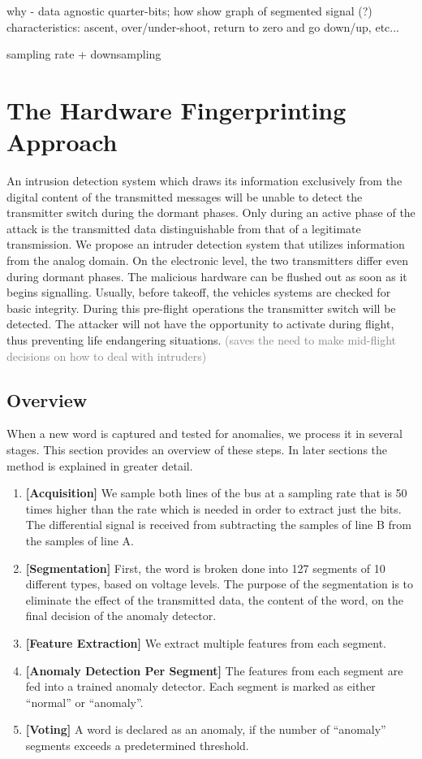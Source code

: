 \documentclass[conference]{IEEEtran}
\begin{document}
  \color{gray}
  why - data agnostic
  quarter-bits; how
  show graph of segmented signal (?)
  characteristics: ascent, over/under-shoot, return to zero and go down/up,
  etc...

  sampling rate + downsampling
  \color{black}
  
\section{The Hardware Fingerprinting Approach}
  An intrusion detection system which draws its information exclusively from the digital content of the transmitted messages will be unable to detect the transmitter switch during the dormant phases. Only during an active phase of the attack is the transmitted data distinguishable from that of a legitimate transmission. We propose an intruder detection system that utilizes information from the analog domain. On the electronic level, the two transmitters differ even during dormant phases. The malicious hardware can be flushed out as soon as it begins signalling.
  Usually, before takeoff, the vehicles systems are checked for basic integrity. During this pre-flight operations the transmitter switch will be detected. The attacker will not have the opportunity to activate during flight, thus preventing life endangering situations. \textcolor{gray}{(saves the need to make mid-flight decisions on how to deal with intruders)}
  
\subsection{Overview} \label{Overview}
  When a new word is captured and tested for anomalies, we process it in several stages. This section provides an overview of these steps. In later sections the method is explained in greater detail.
  
  \begin{enumerate}
    \item \textbf{[Acquisition]}
          We sample both lines of the bus at a sampling rate that is 50 times higher than the rate which is needed in order to extract just the bits. The differential signal is received from subtracting the samples of line B from the samples of line A.
    \item \textbf{[Segmentation]}
          First, the word is broken done into 127 segments of 10 different types, based on voltage levels. The purpose of the segmentation is to eliminate the effect of the transmitted data, the content of the word, on the final decision of the anomaly detector.
    \item \textbf{[Feature Extraction]}
          We extract multiple features from each segment. 
    \item \textbf{[Anomaly Detection Per Segment]}
          The features from each segment are fed into a trained anomaly detector. Each segment is marked as either ``normal'' or ``anomaly''.
    \item \textbf{[Voting]}
          A word is declared as an anomaly, if the number of ``anomaly'' segments exceeds a predetermined threshold.
  \end{enumerate}
  
\end{document}
